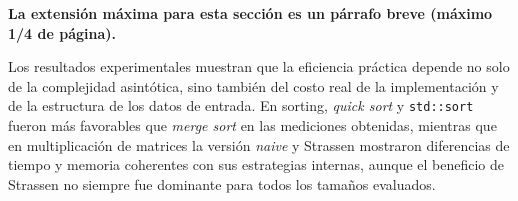 \begin{mdframed}
    \textbf{La extensión máxima para esta sección es un párrafo breve (máximo 1/4 de página).}
\end{mdframed}

Los resultados experimentales muestran que la eficiencia práctica depende no solo de la complejidad asintótica, sino también del costo real de la implementación y de la estructura de los datos de entrada. En sorting, \textit{quick sort} y \texttt{std::sort} fueron más favorables que \textit{merge sort} en las mediciones obtenidas, mientras que en multiplicación de matrices la versión \textit{naive} y Strassen mostraron diferencias de tiempo y memoria coherentes con sus estrategias internas, aunque el beneficio de Strassen no siempre fue dominante para todos los tamaños evaluados.